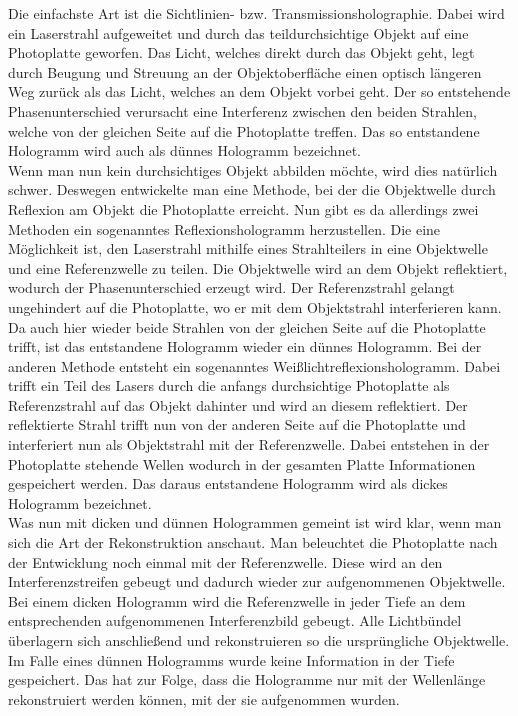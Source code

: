 Die einfachste Art ist die Sichtlinien- bzw. Transmissionsholographie. Dabei wird ein Laserstrahl aufgeweitet und durch das teildurchsichtige Objekt auf eine Photoplatte geworfen. Das Licht, welches direkt durch das Objekt geht, legt durch Beugung und Streuung an der Objektoberfläche einen optisch längeren Weg zurück als das Licht, welches an dem Objekt vorbei geht. Der so entstehende Phasenunterschied verursacht eine Interferenz zwischen den beiden Strahlen, welche von der gleichen Seite auf die Photoplatte treffen. Das so entstandene Hologramm wird auch als dünnes Hologramm bezeichnet.\\

Wenn man nun kein durchsichtiges Objekt abbilden möchte, wird dies natürlich schwer. Deswegen entwickelte man eine Methode, bei der die Objektwelle durch Reflexion am Objekt die Photoplatte erreicht. Nun gibt es da allerdings zwei Methoden ein sogenanntes Reflexionshologramm herzustellen.
Die eine Möglichkeit ist, den Laserstrahl mithilfe eines Strahlteilers in eine Objektwelle und eine Referenzwelle zu teilen. Die Objektwelle wird an dem Objekt reflektiert, wodurch der Phasenunterschied erzeugt wird. Der Referenzstrahl gelangt ungehindert auf die Photoplatte, wo er mit dem Objektstrahl interferieren kann. Da auch hier wieder beide Strahlen von der gleichen Seite auf die Photoplatte trifft, ist das entstandene Hologramm wieder ein dünnes Hologramm.
Bei der anderen Methode entsteht ein sogenanntes Weißlichtreflexionshologramm. Dabei trifft ein Teil des Lasers durch die anfangs durchsichtige Photoplatte als Referenzstrahl auf das Objekt dahinter und wird an diesem reflektiert. Der reflektierte Strahl trifft nun von der anderen Seite auf die Photoplatte und interferiert nun als Objektstrahl mit der Referenzwelle. Dabei entstehen in der Photoplatte stehende Wellen wodurch in der gesamten Platte Informationen gespeichert werden. Das daraus entstandene Hologramm wird als dickes Hologramm bezeichnet.\\

Was nun mit dicken und dünnen Hologrammen gemeint ist wird klar, wenn man sich die Art der Rekonstruktion anschaut.
Man beleuchtet die Photoplatte nach der Entwicklung noch einmal mit der Referenzwelle. Diese wird an den Interferenzstreifen gebeugt und dadurch wieder zur aufgenommenen Objektwelle. Bei einem dicken Hologramm wird die Referenzwelle in jeder Tiefe an dem entsprechenden aufgenommenen Interferenzbild gebeugt. Alle Lichtbündel überlagern sich anschließend und rekonstruieren so die ursprüngliche Objektwelle. Im Falle eines dünnen Hologramms wurde keine Information in der Tiefe gespeichert. Das hat zur Folge, dass die Hologramme nur mit der Wellenlänge rekonstruiert werden können, mit der sie aufgenommen wurden.

